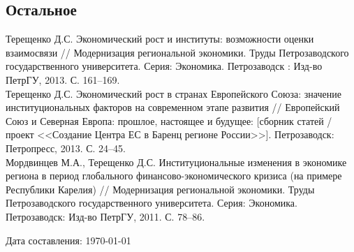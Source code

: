 \documentclass[10pt]{article}
\newcommand{\years}[1]{\marginnote{\scriptsize #1}}
\begin{document}
\subsection*{Остальное}
\noindent
\years{2013}Терещенко Д.С. Экономический рост и институты: возможности оценки взаимосвязи // Модернизация региональной экономики. Труды Петрозаводского государственного университета. Серия: Экономика. Петрозаводск : Изд-во ПетрГУ, 2013. С. 161–169.\\
\years{2013}Терещенко Д.С. Экономический рост в странах Европейского Союза: значение институциональных факторов на современном этапе развития // Европейский Союз и Северная Европа: прошлое, настоящее и будущее: [сборник статей / проект <<Создание Центра ЕС в Баренц регионе России>>]. Петрозаводск: Петропресс, 2013. С. 24–45.\\
\years{2011}Мордвинцев М.А., Терещенко Д.С. Институциональные изменения в экономике региона в период глобального финансово-экономического кризиса (на примере Республики Карелия) // Модернизация региональной экономики. Труды Петрозаводского государственного университета. Серия: Экономика. Петрозаводск: Изд-во ПетрГУ, 2011. С. 78–86.\\



\vfill{}

\begin{center}
	{\scriptsize  Дата составления: \today}
\end{center}
\end{document}
